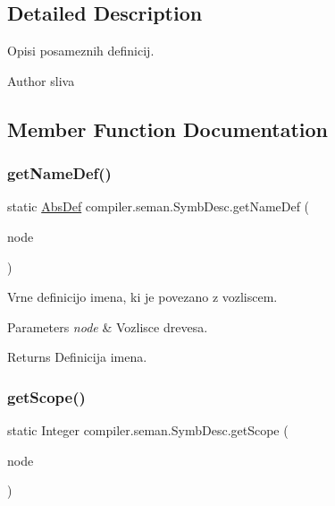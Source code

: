 \subsection{Detailed Description}
Opisi posameznih definicij.

\begin{DoxyAuthor}{Author}
sliva 
\end{DoxyAuthor}


\subsection{Member Function Documentation}
\mbox{\label{classcompiler_1_1seman_1_1_symb_desc_af0e1200fe7e5f3ace19ed1d88dd92c9c}} 
\subsubsection{\texorpdfstring{get\+Name\+Def()}{getNameDef()}}
{\footnotesize\ttfamily static \hyperlink{classcompiler_1_1abstr_1_1tree_1_1def_1_1_abs_def}{Abs\+Def} compiler.\+seman.\+Symb\+Desc.\+get\+Name\+Def (\begin{DoxyParamCaption}\item[{\hyperlink{classcompiler_1_1abstr_1_1tree_1_1_abs_tree}{Abs\+Tree}}]{node }\end{DoxyParamCaption})\hspace{0.3cm}{\ttfamily [static]}}

Vrne definicijo imena, ki je povezano z vozliscem.


\begin{DoxyParams}{Parameters}
{\em node} & Vozlisce drevesa. \\
\hline
\end{DoxyParams}
\begin{DoxyReturn}{Returns}
Definicija imena. 
\end{DoxyReturn}
\mbox{\label{classcompiler_1_1seman_1_1_symb_desc_ae48b37c9f25fad454342652fa331e472}} 
\subsubsection{\texorpdfstring{get\+Scope()}{getScope()}}
{\footnotesize\ttfamily static Integer compiler.\+seman.\+Symb\+Desc.\+get\+Scope (\begin{DoxyParamCaption}\item[{\hyperlink{classcompiler_1_1abstr_1_1tree_1_1_abs_tree}{Abs\+Tree}}]{node }\end{DoxyParamCaption})\hspace{0.3cm}{\ttfamily [static]}}

